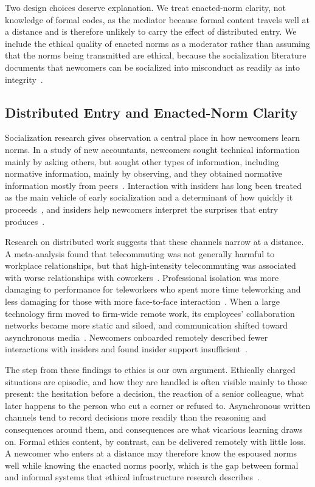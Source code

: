 \documentclass[12pt,a4paper]{article}
\theoremstyle{definition}
\begin{document}
Two design choices deserve explanation. We treat enacted-norm clarity, not knowledge of formal codes, as the mediator because formal content travels well at a distance and is therefore unlikely to carry the effect of distributed entry. We include the ethical quality of enacted norms as a moderator rather than assuming that the norms being transmitted are ethical, because the socialization literature documents that newcomers can be socialized into misconduct as readily as into integrity~\citep{ashforth2003normalization}.

\subsection{Distributed Entry and Enacted-Norm Clarity}

Socialization research gives observation a central place in how newcomers learn norms. In a study of new accountants, newcomers sought technical information mainly by asking others, but sought other types of information, including normative information, mainly by observing, and they obtained normative information mostly from peers~\citep{morrison1993newcomer}. Interaction with insiders has long been treated as the main vehicle of early socialization and a determinant of how quickly it proceeds~\citep{reichers1987interactionist}, and insiders help newcomers interpret the surprises that entry produces~\citep{louis1980surprise}.

Research on distributed work suggests that these channels narrow at a distance. A meta-analysis found that telecommuting was not generally harmful to workplace relationships, but that high-intensity telecommuting was associated with worse relationships with coworkers~\citep{gajendran2007good}. Professional isolation was more damaging to performance for teleworkers who spent more time teleworking and less damaging for those with more face-to-face interaction~\citep{golden2008impact}. When a large technology firm moved to firm-wide remote work, its employees' collaboration networks became more static and siloed, and communication shifted toward asynchronous media~\citep{yang2022effects}. Newcomers onboarded remotely described fewer interactions with insiders and found insider support insufficient~\citep{paik2026membership}.

The step from these findings to ethics is our own argument. Ethically charged situations are episodic, and how they are handled is often visible mainly to those present: the hesitation before a decision, the reaction of a senior colleague, what later happens to the person who cut a corner or refused to. Asynchronous written channels tend to record decisions more readily than the reasoning and consequences around them, and consequences are what vicarious learning draws on. Formal ethics content, by contrast, can be delivered remotely with little loss. A newcomer who enters at a distance may therefore know the espoused norms well while knowing the enacted norms poorly, which is the gap between formal and informal systems that ethical infrastructure research describes~\citep{tenbrunsel2003building}.
\end{document}

